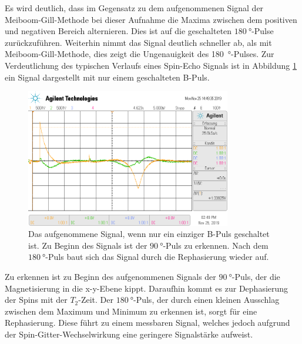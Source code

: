 Es wird deutlich, dass im Gegensatz zu dem aufgenommenen Signal der Meiboom-Gill-Methode bei dieser Aufnahme die Maxima zwischen
dem positiven und negativen Bereich alternieren. Dies ist auf die geschalteten $\SI{180}{\degree}$-Pulse zurückzuführen.
Weiterhin nimmt das Signal deutlich schneller ab, als mit Meiboom-Gill-Methode, dies zeigt die Ungenauigkeit des \SI{180}{\degree}-Pulses.
Zur Verdeutlichung des typischen Verlaufs eines Spin-Echo Signals ist in Abbildung \ref{fig:N1} ein Signal dargestellt mit nur einem
geschalteten B-Puls.
\begin{figure}[H]
  \centering
  \includegraphics[width=0.8\textwidth]{../data/scope_77.png}
  \caption{Das aufgenommene Signal, wenn nur ein einziger B-Puls geschaltet ist. Zu Beginn des Signals ist der
  $\SI{90}{\degree}$-Puls zu erkennen. Nach dem $\SI{180}{\degree}$-Puls baut sich das Signal durch die Rephasierung
  wieder auf.}
  \label{fig:N1}
\end{figure} \noindent
Zu erkennen ist zu Beginn des aufgenommenen Signals der $\SI{90}{\degree}$-Puls, der die Magnetisierung in die x-y-Ebene kippt.
Daraufhin kommt es zur Dephasierung der Spins mit der $T_2$-Zeit. Der $\SI{180}{\degree}$-Puls, der durch einen kleinen Ausschlag
zwischen dem Maximum und Minimum zu erkennen ist, sorgt für eine Rephasierung. Diese führt zu einem messbaren Signal, welches
jedoch aufgrund der Spin-Gitter-Wechselwirkung eine geringere Signalstärke aufweist.

